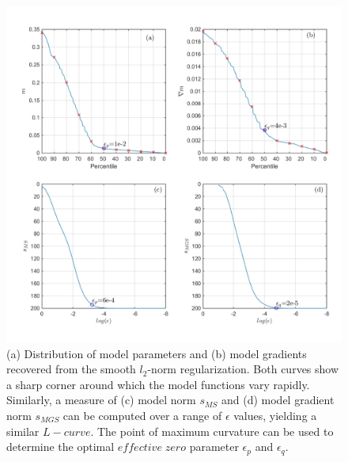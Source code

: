 \begin{figure}[p]
\includegraphics[scale=0.6]{1D_Model_curve}
\caption{(a) Distribution of model parameters and (b) model gradients recovered from the smooth $l_2$-norm regularization.
Both curves show a sharp corner around which the model functions vary rapidly. Similarly, a measure of (c) model norm $s_{MS}$ and (d)  model gradient norm $s_{MGS}$ can be computed over a range of $\epsilon$ values, yielding a similar $L-curve$. The point of maximum curvature can be used to determine the optimal $effective\;zero$ parameter $\epsilon_p$ and $\epsilon_q$. }
\label{fig:1D_Model_curve}
\end{figure}
